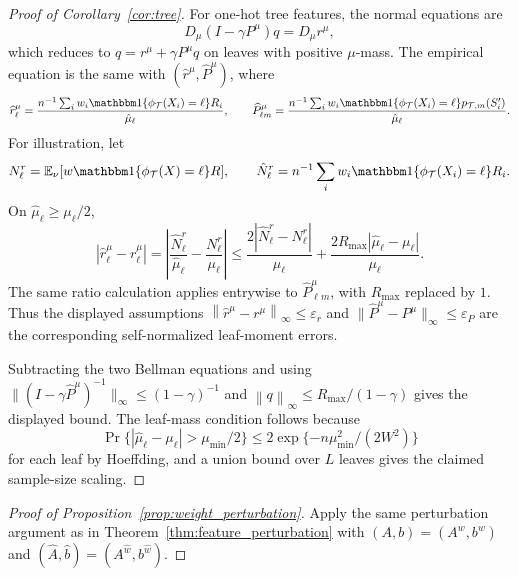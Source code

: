\documentclass{article}
\newcommand{\E}{\mathbb{E}}
\newcommand{\cT}{\mathcal T}
\newcommand{\one}{\mathbbm 1}
\newcommand{\linf}[1]{\left\lVert #1 \right\rVert_\infty}
\newcommand{\hatP}{\widehat P}
\newcommand{\hatr}{\widehat r}
\newcommand{\hatA}{\widehat A}
\newcommand{\hatb}{\widehat b}
\theoremstyle{plain}
\theoremstyle{definition}
\theoremstyle{remark}
\begin{document}
\begin{proof}[Proof of Corollary~\ref{cor:tree}]
For one-hot tree features, the normal equations are
\[
  D_\mu(I-\gamma P^\mu)q=D_\mu r^\mu,
\]
which reduces to \(q=r^\mu+\gamma P^\mu q\) on leaves with positive
\(\mu\)-mass. The empirical equation is the same with
\((\hatr^\mu,\hatP^\mu)\), where
\[
  \hatr^\mu_\ell
  =
  \frac{n^{-1}\sum_i w_i\one\{\phi_{\cT}(X_i)=\ell\}R_i}
       {\hat\mu_\ell},
  \qquad
  \hatP^\mu_{\ell m}
  =
  \frac{n^{-1}\sum_i w_i\one\{\phi_{\cT}(X_i)=\ell\}
    p_{\cT,m}(S'_i)}
       {\hat\mu_\ell}.
\]
For illustration, let
\[
  N^r_\ell=\E_\nu[w\one\{\phi_{\cT}(X)=\ell\}R],
  \qquad
  \hat N^r_\ell=n^{-1}\sum_iw_i\one\{\phi_{\cT}(X_i)=\ell\}R_i.
\]
On \(\hat\mu_\ell\ge\mu_\ell/2\),
\[
  |\hatr^\mu_\ell-r^\mu_\ell|
  =
  \left|\frac{\hat N^r_\ell}{\hat\mu_\ell}
  -\frac{N^r_\ell}{\mu_\ell}\right|
  \le
  \frac{2|\hat N^r_\ell-N^r_\ell|}{\mu_\ell}
  +
  \frac{2R_{\max}|\hat\mu_\ell-\mu_\ell|}{\mu_\ell}.
\]
The same ratio calculation applies entrywise to \(\hatP^\mu_{\ell m}\), with
\(R_{\max}\) replaced by \(1\). Thus the displayed assumptions
\(\linf{\hatr^\mu-r^\mu}\le\varepsilon_r\) and
\(\|\hatP^\mu-P^\mu\|_\infty\le\varepsilon_P\) are the corresponding
self-normalized leaf-moment errors.

Subtracting the two Bellman equations and using
\(\|(I-\gamma\hatP^\mu)^{-1}\|_\infty\le(1-\gamma)^{-1}\) and
\(\linf{q}\le R_{\max}/(1-\gamma)\) gives the displayed bound. The leaf-mass
condition follows because
\[
  \Pr\{|\hat\mu_\ell-\mu_\ell|>\mu_{\min}/2\}
  \le
  2\exp\{-n\mu_{\min}^2/(2W^2)\}
\]
for each leaf by Hoeffding, and a union bound over \(L\) leaves gives the
claimed sample-size scaling.
\end{proof}

\begin{proof}[Proof of Proposition~\ref{prop:weight_perturbation}]
Apply the same perturbation argument as in
Theorem~\ref{thm:feature_perturbation} with
\((A,b)=(A^w,b^w)\) and \((\hatA,\hatb)=(A^{\hat w},b^{\hat w})\).
\end{proof}
\end{document}
